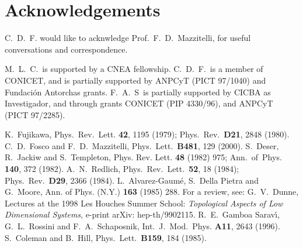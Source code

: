 \documentclass[a4paper,12pt]{article}
\begin{document}
\section*{Acknowledgements}
C.~D.~F. would like to acknwledge Prof.~F.~D.~Mazzitelli, for useful
conversations and correspondence.

\noindent M.~L.~C.~is supported by a CNEA fellowship.  C.~D.~F.~is a member
of CONICET, and is partially supported by ANPCyT (PICT 97/1040) and
Fundaci\'on Antorchas grants.  F.~A.~S~is partially supported by CICBA
as Investigador, and through grants CONICET (PIP 4330/96), and ANPCyT
(PICT 97/2285).

\newpage
\begin{thebibliography}{bib}
K.~Fujikawa, Phys.~Rev.~Lett. {\bf 42}, 1195 (1979);
 Phys.~Rev.~{\bf D21}, 2848 (1980).
C.~D.~Fosco and F.~D.~Mazzitelli, Phys.~Lett.~{\bf B481},
  129 (2000). 
S.~Deser, R.~Jackiw and S.~Templeton, 
Phys. Rev. Lett. {\bf 48} (1982) 975;
Ann.~of~Phys. {\bf 140}, 372 (1982).  
A.~N.~Redlich, Phys.~Rev.~Lett.~{\bf 52}, 18 (1984); Phys.~Rev.~{\bf D29}, 2366 (1984).
 L.~Alvarez-Gaum\'e, S.~Della Pietra and G.~Moore, Ann. of
Phys.  (N.Y.) {\bf 163} (1985) 288.
For a review, see:
  G.~V.~Dunne, Lectures at the 1998 Les Houches Summer School: {\em
    Topological Aspects of Low Dimensional Systems}, e-print arXiv:
  hep-th/9902115.  
R.~E.~Gamboa Sarav\'{\i},
  G.~L.~Rossini and F.~A.~Schaposnik, Int.~J.~Mod.~Phys. {\bf A11},
  2643 (1996).  
S.~Coleman and B.~Hill,
  Phys.~Lett.~{\bf B159}, 184 (1985).
\end{thebibliography}
\end{document}

